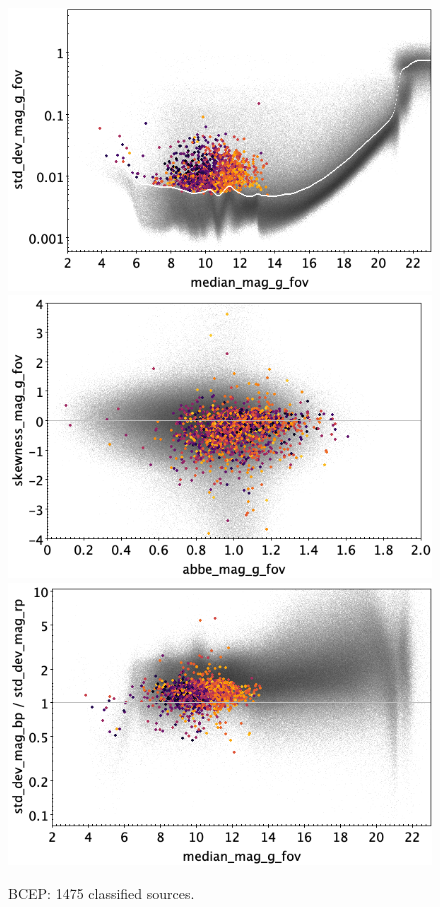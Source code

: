 \documentclass[longauth]{aa}
\begin{document}
\begin{appendix}
\begin{figure}
\hspace{2mm}
 \includegraphics[width=0.45\hsize]{figures/appendix/BCEP_cls_msd.png} \\ %
\vspace{4mm}
 \includegraphics[width=0.45\hsize]{figures/appendix/BCEP_cls_ask.png}  %
\hspace{2mm}
 \includegraphics[width=0.45\hsize]{figures/appendix/BCEP_cls_msdr.png}  \\ %
\vspace{4mm}
 \caption{BCEP: 1475 classified sources.}  
 \label{fig:app:BCEP}
\end{figure}


\end{appendix}
\end{document}

